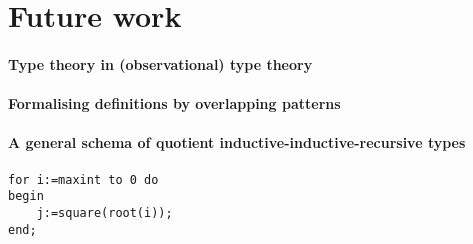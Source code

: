 \documentclass[a4paper,UKenglish,numberwithinsect,cleveref,thm-restate]{lipics-v2021}
\begin{document}
\section{Future work}

\paragraph*{Type theory in (observational) type theory}

\paragraph*{Formalising definitions by overlapping patterns}

\paragraph*{A general schema of quotient inductive-inductive-recursive types}


\appendix

\begin{conjecture}\label{testenv-conjecture}
\end{conjecture}

\begin{claim}\label{testenv-claim}
\end{claim}

\begin{claim*}\label{testenv-claim2}
\end{claim*}

\begin{claimproof}
\end{claimproof}
\begin{lstlisting}[caption={Formal definition in \Agda},label=list:8-6,captionpos=t,float,abovecaptionskip=-\medskipamount]
for i:=maxint to 0 do 
begin 
    j:=square(root(i));
end;
\end{lstlisting}
\end{document}
